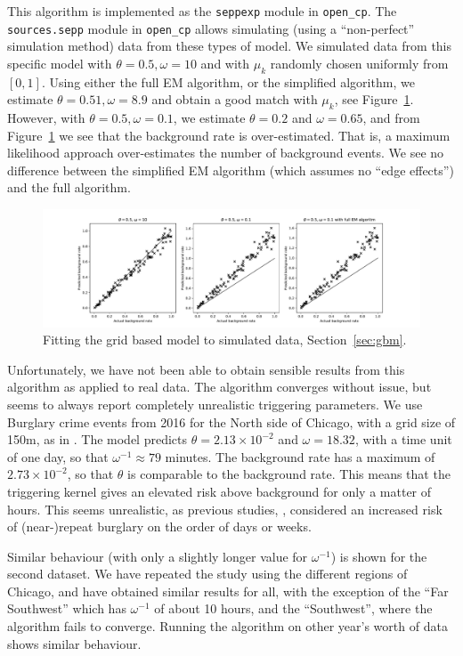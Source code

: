 \documentclass[twoside,a4paper]{article}
\theoremstyle{plain}
\theoremstyle{definition}
\begin{document}
This algorithm is implemented as the \texttt{seppexp} module in \texttt{open\_cp}.
The \texttt{sources.sepp} module in \texttt{open\_cp} allows simulating (using a ``non-perfect''
simulation method) data from these types of model.  We simulated data from this
specific model with $\theta=0.5, \omega=10$ and with $\mu_k$ randomly chosen uniformly
from $[0,1]$.  Using either the full EM algorithm, or the simplified algorithm, we
estimate $\theta=0.51, \omega=8.9$ and obtain a good match with $\mu_k$, see
Figure~\ref{fig:sim_grid}.  However, with $\theta=0.5, \omega=0.1$, we estimate $\theta=0.2$
and $\omega=0.65$, and from Figure~\ref{fig:sim_grid} we see that the background rate
is over-estimated.  That is, a maximum likelihood approach over-estimates the number
of background events.  We see no difference between the simplified EM algorithm (which assumes
no ``edge effects'') and the full algorithm.

\begin{figure}
  \includegraphics[width=\textwidth]{../notebooks/simdata.pdf}
  \caption{Fitting the grid based model to simulated data, Section~\ref{sec:gbm}.}
  \label{fig:sim_grid}
\end{figure}

Unfortunately, we have not been able to obtain sensible results from this algorithm
as applied to real data.  The algorithm converges without issue, but seems to always
report completely unrealistic triggering parameters.  We use Burglary crime events
from 2016 for the North side of Chicago, with a grid size of 150m, as in \cite{sepp2}.
The model predicts $\theta = 2.13 \times 10^{-2}$
and $\omega = 18.32$, with a time unit of one day, so that $\omega^{-1} \approx 79$
minutes.  The background rate has a maximum of $2.73\times 10^{-2}$, so that $\theta$ is
comparable to the background rate.  This means that the triggering kernel gives an
elevated risk above background for only a matter of hours.  This seems unrealistic, as
previous studies, \cite{jb}, considered an increased risk of (near-)repeat burglary
on the order of days or weeks.

Similar behaviour (with only a slightly longer value for $\omega^{-1}$) is shown for
the second dataset.
We have repeated the study using the different regions of Chicago, and have obtained
similar results for all, with the exception of the ``Far Southwest'' which has $\omega^{-1}$
of about 10 hours, and the ``Southwest'', where the algorithm fails to converge.
Running the algorithm on other year's worth of data shows similar behaviour.
\end{document}
